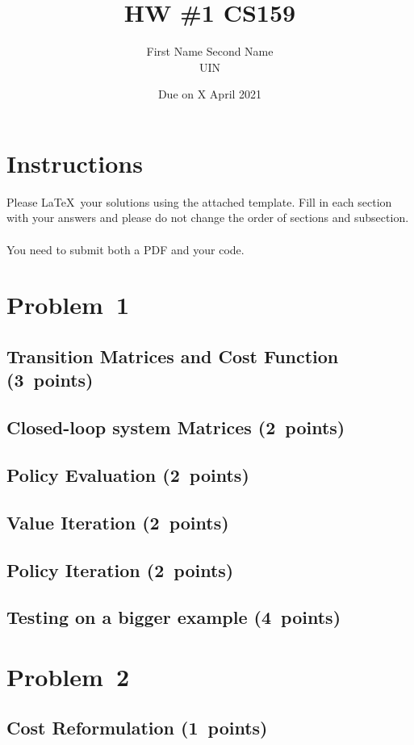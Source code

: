 \documentclass{article}
\title{HW \#1 CS159}
\author{First Name Second Name \\ UIN}
\date{Due on X April 2021}
\begin{document}
\maketitle

\section*{Instructions}
Please \LaTeX~your solutions using the attached template. Fill in each section with your answers and please do not change the order of sections and subsection. ~\\

\noindent
You need to submit both a PDF and your code. ~\\


\section{Problem~1}

\subsection{Transition Matrices and Cost Function (3~points)}
\subsection{Closed-loop system Matrices (2~points)}
\subsection{Policy Evaluation (2~points)}
\subsection{Value Iteration (2~points)}
\subsection{Policy Iteration (2~points)}
\subsection{Testing on a bigger example (4~points)}

\section{Problem~2}
\subsection{Cost Reformulation (1~points)}
\end{document}
